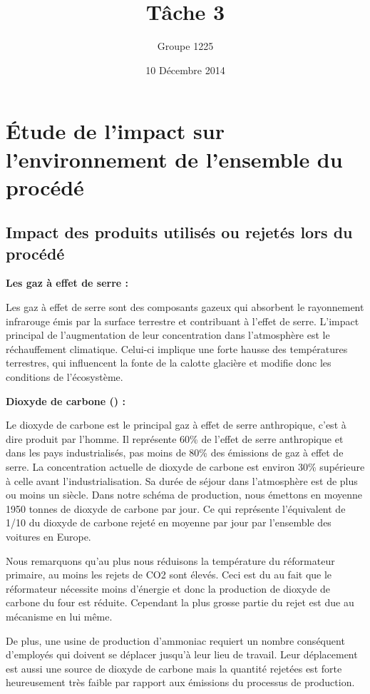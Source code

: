 \documentclass[a4paper, oneside, 12pt]{article}
\title{Tâche 3}
\author{Groupe 1225}
\date{10 Décembre 2014}
\begin{document}
\maketitle

\section*{Étude de l'impact sur l'environnement de l'ensemble du procédé}

\subsection*{Impact des produits utilisés ou rejetés lors du procédé}

\textbf{Les gaz à effet de serre :} 

Les gaz à effet de serre sont des composants gazeux qui absorbent le rayonnement infrarouge émis par la surface terrestre et contribuant à l’effet de serre. L’impact principal de l’augmentation de leur concentration dans l’atmosphère est le réchauffement climatique. Celui-ci implique une forte hausse des températures terrestres, qui influencent la fonte de la calotte glacière et modifie donc les conditions de l’écosystème. \newline


\textbf{Dioxyde de carbone () :}

Le dioxyde de carbone est le principal gaz à effet de serre anthropique, c’est à dire produit par l’homme. Il représente 60\% de l’effet de serre anthropique et dans les pays industrialisés, pas moins de 80\% des émissions de gaz à effet de serre. La concentration actuelle de dioxyde de carbone est environ 30\% supérieure à celle avant l’industrialisation. Sa durée de séjour dans l’atmosphère est de plus ou moins un siècle. Dans notre schéma de production, nous émettons en moyenne 1950 tonnes de dioxyde de carbone par jour. Ce qui représente l’équivalent de 1/10 du dioxyde de carbone rejeté en moyenne par jour par l’ensemble des voitures en Europe.

Nous remarquons qu’au plus nous réduisons la température du réformateur primaire, au moins les rejets de CO2 sont élevés. Ceci est du au fait que le réformateur nécessite moins d’énergie et donc la production de dioxyde de carbone du four est réduite. Cependant la plus grosse partie du rejet est due au mécanisme en lui même. 

De plus, une usine de production d’ammoniac requiert un nombre conséquent d’employés qui doivent se déplacer jusqu’à leur lieu de travail. Leur déplacement est aussi une source de dioxyde de carbone mais la quantité rejetées est forte heureusement très faible par rapport aux émissions du processus de production. \newline
\end{document}
